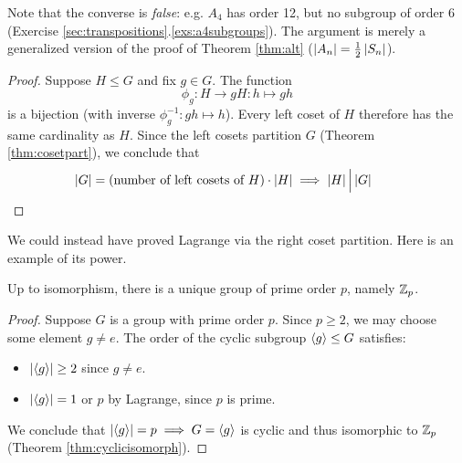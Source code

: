 Note that the converse is \emph{false}: e.g.{} $A_4$ has order 12, but no subgroup of order 6 (Exercise \ref*{sec:transpositions}.\ref{exs:a4subgroups}). The argument is merely a generalized version of the proof of Theorem \ref{thm:alt} ($\left| A_n\right|=\frac 12\left| S_n\right|$).



\begin{proof}
	Suppose $H\le G$ and fix $g\in G$. The function
	\[
		\phi_g:H\to gH:h\mapsto gh
	\]
	is a bijection (with inverse $\phi_g^{-1}:gh\mapsto h$). Every left coset of $H$ therefore has the same cardinality as $H$. Since the left cosets partition $G$ (Theorem \ref{thm:cosetpart}), we conclude that
	\[
		\left| G\right|=\text{(number of left cosets of $H$)}\cdot \left| H\right|
		\implies \left| H\right|\Big\vert \left| G\right|
		\tag*{\qedhere}
	\]
\end{proof}


We could instead have proved Lagrange via the right coset partition. Here is an example of its power.

\begin{cor}{}{}
	Up to isomorphism, there is a unique group of prime order $p$, namely $\mathbb{Z}_p$.
\end{cor}

\begin{proof}
	Suppose $G$ is a group with prime order $p$. Since $p\ge 2$, we may choose some element $g\neq e$. The order of the cyclic subgroup $\left\langle g\right\rangle\le G$ satisfies:
	\begin{itemize}%
	  \item $\left| \left\langle g\right\rangle\right|\ge 2$ since $g\neq e$.
	  \item $\left| \left\langle g\right\rangle\right|=1$ or $p$ by Lagrange, since $p$ is prime.
	\end{itemize}
	We conclude that $\left| \left\langle g\right\rangle\right|=p\implies G=\left\langle g\right\rangle$ is cyclic and thus isomorphic to $\mathbb{Z}_p$ (Theorem \ref{thm:cyclicisomorph}).
\end{proof}

